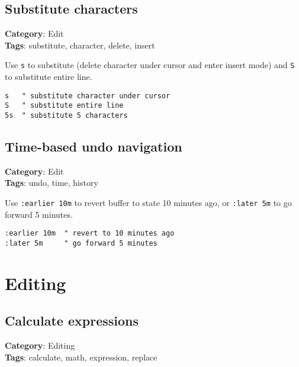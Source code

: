 {{{\section{Substitute characters}

\textbf{Category}: Edit\\ \textbf{Tags}: substitute, character, delete, insert
\vspace{0.5cm}

Use {\footnotesize \Verb§s§} to substitute (delete character under cursor and enter insert mode) and {\footnotesize \Verb§S§} to substitute entire line.

\begin{Exa*}{}
\begin{Verbatim}[fontsize=\footnotesize, breaklines, breakanywhere]
s   " substitute character under cursor
S   " substitute entire line
5s  " substitute 5 characters
\end{Verbatim}
\end{Exa*}

\section{Time-based undo navigation}

\textbf{Category}: Edit\\ \textbf{Tags}: undo, time, history
\vspace{0.5cm}

Use {\footnotesize \Verb§:earlier 10m§} to revert buffer to state 10 minutes ago, or {\footnotesize \Verb§:later 5m§} to go forward 5 minutes.

\begin{Exa*}{}
\begin{Verbatim}[fontsize=\footnotesize, breaklines, breakanywhere]
:earlier 10m  " revert to 10 minutes ago
:later 5m     " go forward 5 minutes
\end{Verbatim}
\end{Exa*}

\chapter{Editing}
\section{Calculate expressions}

\textbf{Category}: Editing\\ \textbf{Tags}: calculate, math, expression, replace
\vspace{0.5cm}

}}}
